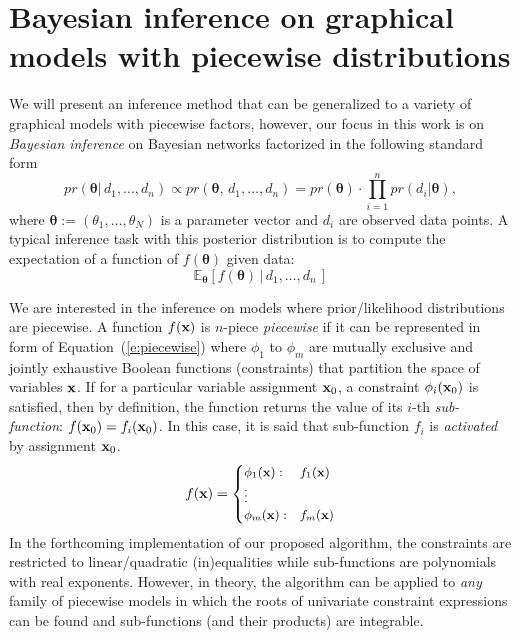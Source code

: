 \section{Bayesian inference on graphical models with piecewise distributions}
\label{sec:inference_piecewise_models}
 We will present an inference method that can be generalized to  
a variety of graphical models with piecewise factors, however, our focus in this
work is on \emph{Bayesian inference} on Bayesian networks factorized in the following
standard form 
\begin{equation}
\label{e:posterior}
pr(\boldsymbol\theta | \, d_1, \ldots, d_n) 
\propto
pr(\boldsymbol\theta, \, d_1, \ldots, d_n) 
= pr(\boldsymbol\theta) \cdot \prod_{i=1}^{n} pr(d_i | \boldsymbol\theta) , 
\end{equation} 
where $\boldsymbol\theta := (\theta_1, \ldots, \theta_N)$ is a parameter vector and $d_i$ are observed data points. 
A typical inference task %
with this posterior distribution is to compute the expectation of a function of $f(\boldsymbol\theta)$ given data:
\begin{equation}
\label{e:prob.outcome}
\mathbb{E}_{\boldsymbol\theta}[f(\boldsymbol\theta) \,|\, d_1, \ldots, d_n \,]
\end{equation}


We are interested in the inference on models where prior/likelihood distributions are piecewise.
A function $f(\textbf{x})$ is $n$-piece \emph{piecewise} if it can be represented in form of Equation~(\ref{e:piecewise}) where $\phi_1$ to $\phi_m$ are mutually exclusive and jointly exhaustive Boolean functions (constraints) 
that partition the space of variables $\textbf{x}$. If for a particular variable assignment $\textbf{x}_0$, a constraint $\phi_i(\textbf{x}_0)$ is satisfied, then by definition, the function returns the value of its $i$-th \emph{sub-function}: $f(\textbf{x}_0) = f_i(\textbf{x}_0)$.  
In this case, it is said that sub-function $f_i$ is \emph{activated} by assignment $\textbf{x}_0$.
\begin{equation}
\label{e:piecewise}
f(\bvec{x}) = 
{\footnotesize
\begin{cases}
\phi_1(\bvec{x}) : & f_1(\bvec{x})\\
\vdots\\
\phi_m(\bvec{x}) : & f_m(\bvec{x})
\end{cases}
}%
\end{equation}
In the forthcoming implementation of our proposed algorithm, the constraints are restricted to linear/quadratic (in)equalities while sub-functions are polynomials with real exponents.%
  However, in theory, the algorithm can be applied to \emph{any} family of piecewise models in which the roots of univariate constraint expressions can be found and sub-functions (and their products) are integrable. 


